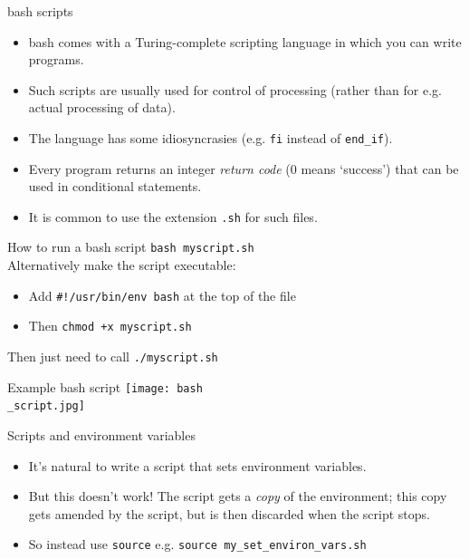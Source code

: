 \documentclass[dvipsnames]{beamer}
\newcommand{\command}[1]{\colorbox{light-gray}{\texttt{#1}}}
\newcommand{\filename}[1]{\colorbox{light-green}{\texttt{#1}}}
\begin{document}
\begin{frame}{bash scripts}
  \begin{itemize}
  \item bash comes with a Turing-complete scripting language in which you can write programs.
  \item Such scripts are usually used for control of processing (rather than for e.g. actual processing of data).
  \item The language has some idiosyncrasies (e.g. \command{fi} instead of \command{end\_if}).
  \item Every program returns an integer \textit{return code} ($0$ means `success') that can be used in conditional statements.
  \item It is common to use the extension \filename{.sh} for such files.
  \end{itemize}
\end{frame}


\begin{frame}{How to run a bash script}
    \command{bash myscript.sh} \\
  \vspace{1cm}
  Alternatively make the script executable:
  \begin{itemize}
  \item Add \command{\#!/usr/bin/env bash} at the top of the file
   \item Then \command{chmod +x myscript.sh}
     \end{itemize}
     Then just need to call \command{./myscript.sh}
\end{frame}


\begin{frame}{Example bash script}
  \texttt{[image: bash\\\_script.jpg]}
\end{frame}


\begin{frame}{Scripts and environment variables}
\begin{itemize}
\item It's natural to write a script that sets environment variables.
\item But this doesn't work! The script gets a \textit{copy} of the environment; this copy gets amended by the script, but is then discarded when the script stops.
\item So instead use \command{source} e.g. \command{source my\_set\_environ\_vars.sh}
\end{itemize}
\end{frame}
\end{document}
